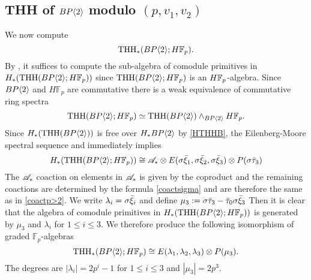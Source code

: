 \subsection{THH of $BP\langle 2 \rangle$ modulo $(p,v_1,v_2)$}
We now compute 
\[\operatorname{THH}_*(BP\langle 2 \rangle;H\mathbb{F}_p).\] 
By \cite[Lem. 4.1]{AngeltveitRognes}, it suffices to compute the sub-algebra of comodule primitives in $H_*(\operatorname{THH}(BP\langle 2 \rangle;H\mathbb{F}_p))$ since $\operatorname{THH}(BP\langle 2 \rangle;H\mathbb{F}_p)$ is an $H\mathbb{F}_p$-algebra. Since $BP\langle 2 \rangle$ and $H\mathbb{F}_p$ are commutative there is a weak equivalence of commutative ring spectra
\[ \operatorname{THH}(BP\langle 2 \rangle;H\mathbb{F}_p)\simeq \operatorname{THH}(BP\langle 2 \rangle)\wedge_{BP\langle 2 \rangle} H\mathbb{F}_p. \] 
Since $H_*(\operatorname{THH}(BP\langle 2 \rangle))$ is free over $H_*BP\langle 2 \rangle$ by \eqref{HTHHB}, the Eilenberg-Moore spectral sequence and \cite[Cor. 5.13]{AngeltveitRognes} immediately implies
\begin{equation}\label{eqn:HTHH(R;F_p)}
H_*(\THH(\B;H\F_p))\cong %
\A_* \otimes E(\sigma \bxi_1, \sigma \bxi_2, \sigma \bxi_3)\otimes P(\sigma \btau_3) %
\end{equation}
The $\mathscr{A}_*$ coaction on elements in $\mathscr{A}_*$ is given by the coproduct and the remaining coactions are determined by the formula \eqref{coactsigma} and are therefore the same as in \eqref{coactp>2}.
We write $\lambda_i=\sigma\bar{\xi}_i$ and define $\mu_3:= \sigma \bar{\tau}_3 -\bar{\tau}_0\sigma \bar{\xi}_3$ %
Then it is clear that the algebra of comodule primitives in $H_*(\operatorname{THH}(BP\langle 2 \rangle ;H\mathbb{F}_p))$ is generated by $\mu_3$ and $\lambda_i$ for $1\le i\le 3$. We therefore produce the following isomorphism of graded $\mathbb{F}_p$-algebras
\begin{equation}\label{eqn:THH(R;F_p)}
\operatorname{THH}_*(BP\langle 2 \rangle;H\mathbb{F}_p)\cong E(\lambda_1, \lambda_2, \lambda_3)\otimes P(\mu_3).
\end{equation}
The degrees are $|\lambda_i|=2p^i-1$ for $1\le i\le 3$ and $|\mu_3| = 2p^3$. 

